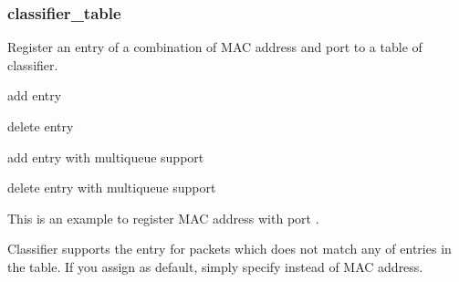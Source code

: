 \documentclass[a4paper,11pt,openany,oneside,english]{sphinxmanual}
\begin{document}
\subsubsection{classifier\_table}
\label{\detokenize{commands/secondary/spp_vf:classifier-table}}\label{\detokenize{commands/secondary/spp_vf:commands-spp-vf-classifier-table}}
Register an entry of a combination of MAC address and port to
a table of classifier.

\begin{sphinxVerbatim}[commandchars=\\\{\},formatcom=\footnotesize]
 add entry

 delete entry

 add entry with multi\PYGZhy{}queue support

 delete entry with multi\PYGZhy{}queue support
\end{sphinxVerbatim}

This is an example to register MAC address 
with port .

\begin{sphinxVerbatim}[commandchars=\\\{\},formatcom=\footnotesize]
\end{sphinxVerbatim}

Classifier supports the  entry for packets which does not
match any of entries in the table. If you assign  as default,
simply specify  instead of MAC address.

\begin{sphinxVerbatim}[commandchars=\\\{\},formatcom=\footnotesize]
\end{sphinxVerbatim}
\end{document}
